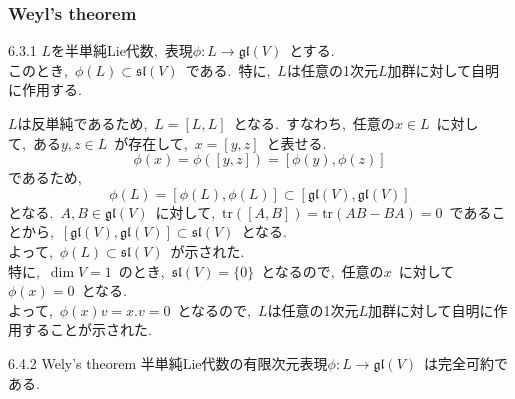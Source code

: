 \documentclass[uplatex,dvipdfmx]{jsarticle}
\begin{document}
\subsubsection{Weyl's theorem}
\begin{mylemma}{6.3.1}
    $L$を半単純Lie代数,~表現$\phi: L \to \mathfrak{gl}(V)$~とする.\\
    このとき,~$\phi(L) \subset \mathfrak{sl}(V)$~である.~特に,~$L$は任意の1次元$L$加群に対して自明に作用する.
\end{mylemma}
\begin{myproof}
    $L$は反単純であるため,~$L = [L, L]$~となる.~すなわち,~任意の$x\in L$~に対して,~ある$y , z\in L$~が存在して,~$x = [y , z ]$~と表せる.\\
    \begin{equation*}
        \phi(x) = \phi([y, z]) = [\phi(y), \phi(z)]
    \end{equation*}
    であるため,~
    \begin{equation*}
        \phi(L) = [\phi(L), \phi(L)] \subset [\mathfrak{gl}(V), \mathfrak{gl}(V)]
    \end{equation*}
    となる.~$A,B \in \mathfrak{gl}(V)$~に対して,~$\text{tr}([A,B]) = \text{tr}(AB - BA) = 0$~であることから,~$[\mathfrak{gl}(V), \mathfrak{gl}(V)] \subset \mathfrak{sl}(V)$~となる.\\
    よって,~$\phi(L) \subset \mathfrak{sl}(V)$~が示された.\\
    特に,~$\dim V = 1$~のとき,~$\mathfrak{sl}(V) = \{0\}$~となるので,~任意の$x$~に対して~$\phi(x) = 0$~となる.\\
    よって,~$\phi(x)v = x.v = 0$~となるので,~$L$は任意の1次元$L$加群に対して自明に作用することが示された.
\end{myproof}
\begin{mythm}{6.4.2 Wely's theorem}
    半単純Lie代数の有限次元表現$\phi: L \to \mathfrak{gl}(V)$~は完全可約である.
\end{mythm}
\end{document}

